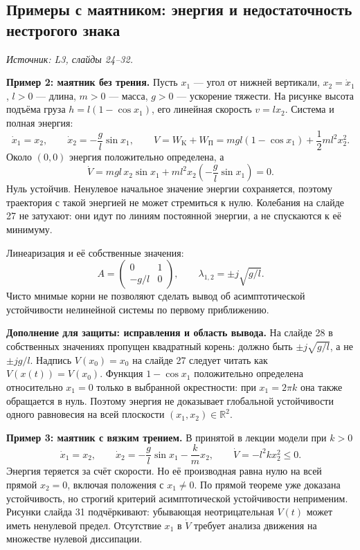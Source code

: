 \subsection{Примеры с маятником: энергия и недостаточность нестрогого знака}
\label{subsec:stability-pendulum}
\noindent\textit{Источник: L3, слайды 24--32.}

\textbf{Пример 2: маятник без трения.}
Пусть $x_1$ --- угол от нижней вертикали, $x_2=\dot x_1$,
$l>0$ --- длина, $m>0$ --- масса, $g>0$ --- ускорение тяжести.
На рисунке высота подъёма груза $h=l(1-\cos x_1)$,
его линейная скорость $v=lx_2$. Система и полная энергия:
\[
 \dot x_1=x_2,\qquad \dot x_2=-\frac{g}{l}\sin x_1,
 \qquad
 V=W_{\mathrm K}+W_{\mathrm П}
   =mgl(1-\cos x_1)+\frac12ml^2x_2^2.
\]
Около $(0,0)$ энергия положительно определена, а
\[
 \dot V=mgl\,x_2\sin x_1
       +ml^2x_2\left(-\frac{g}{l}\sin x_1\right)=0.
\]
Нуль устойчив. Ненулевое начальное значение энергии сохраняется,
поэтому траектория с такой энергией не может стремиться к нулю.
Колебания на слайде 27 не затухают: они идут по линиям постоянной
энергии, а не спускаются к её минимуму.

Линеаризация и её собственные значения:
\[
 A=\begin{pmatrix}0&1\\-g/l&0\end{pmatrix},\qquad
 \lambda_{1,2}=\pm j\sqrt{g/l}.
\]
Чисто мнимые корни не позволяют сделать вывод об асимптотической
устойчивости нелинейной системы по первому приближению.

\textbf{Дополнение для защиты: исправления и область вывода.}
На слайде 28 в собственных значениях пропущен квадратный корень:
должно быть $\pm j\sqrt{g/l}$, а не $\pm jg/l$.
Надпись $V(x_0)=x_0$ на слайде 27 следует читать как
$V(x(t))=V(x_0)$.
Функция $1-\cos x_1$ положительно определена относительно
$x_1=0$ только в выбранной окрестности: при $x_1=2\pi k$
она также обращается в нуль. Поэтому энергия не доказывает
глобальной устойчивости одного равновесия на всей плоскости
$(x_1,x_2)\in\mathbb R^2$.

\textbf{Пример 3: маятник с вязким трением.}
В принятой в лекции модели при $k>0$
\[
 \dot x_1=x_2,\qquad
 \dot x_2=-\frac{g}{l}\sin x_1-\frac{k}{m}x_2,
 \qquad \dot V=-l^2kx_2^2\le0.
\]
Энергия теряется за счёт скорости. Но её производная равна нулю
на всей прямой $x_2=0$, включая положения с $x_1\ne0$.
По прямой теореме уже доказана устойчивость, но строгий критерий
асимптотической устойчивости неприменим.
Рисунки слайда 31 подчёркивают: убывающая неотрицательная $V(t)$
может иметь ненулевой предел. Отсутствие $x_1$ в $\dot V$ требует
анализа движения на множестве нулевой диссипации.

